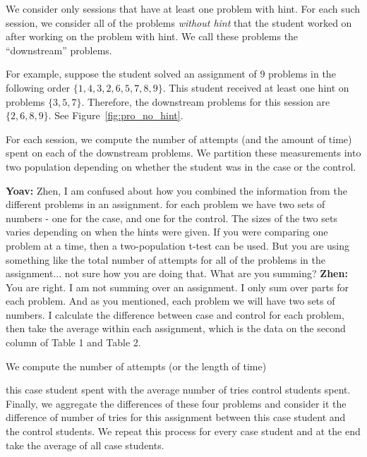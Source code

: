 \documentclass{llncs}
\begin{document}
We consider only sessions that have at least one problem with
hint. For each such session, we consider all of the problems {\em
  without hint} that the student worked on after working on the
problem with hint. We call these problems the ``downstream'' problems.

For example, suppose the student solved an assignment of 9 problems in the
following order $\{ 1, 4, 3, 2, 6, 5, 7, 8, 9\}$. This student
received at least one hint on problems $\{3, 5, 7\}$. Therefore, the
downstream problems for this session are $\{2, 6, 8, 9\}$. See
Figure~\ref{fig:pro_no_hint}.

For each session, we compute the number of attempts (and the amount of
time) spent on each of the downstream problems. We partition these
measurements into two population depending on whether the student was
in the case or the control.

{\bf Yoav:} Zhen, I am confused about how you combined the information
from the different problems in an assignment. for each problem we have
two sets of numbers - one for the case, and one for the control. The
sizes of the two sets varies depending on when the hints were
given. If you were comparing one problem at a time, then a
two-population t-test can be used. But you are using something like
the total number of attempts for all of the problems in the
assignment... not sure how you are doing that. What are you summing?
{\bf Zhen:} You are right. I am not summing over an assignment. I only sum over parts for each problem. And as you mentioned, each problem we will have two sets of numbers. I calculate the difference between case and control for each problem, then take the average within each assignment, which is the data on the second column of Table 1 and Table 2.

We compute the number of attempts (or the length of time)

this case student spent with the
average number of tries control students spent. Finally, we aggregate
the differences of these four problems and consider it the difference
of number of tries for this assignment between this case student and
the control students. We repeat this process for every case student
and at the end take the average of all case students.
\end{document}
